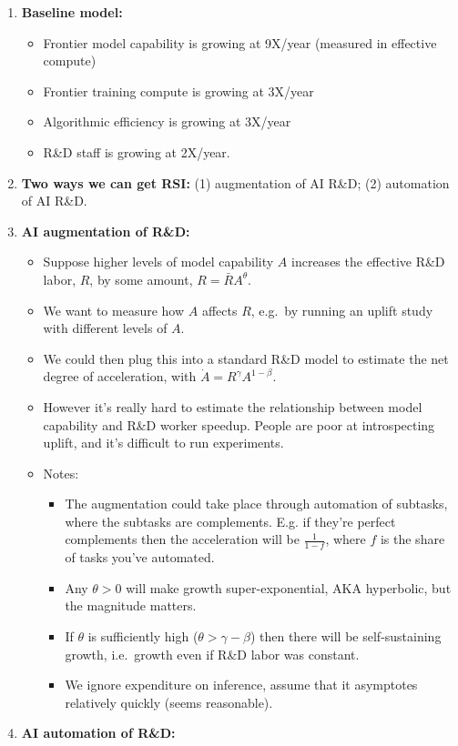 \documentclass[
  11pt,
  letterpaper,
  DIV=11,
  numbers=noendperiod]{scrartcl}
\providecommand{\tightlist}{%
  \setlength{\itemsep}{0pt}\setlength{\parskip}{0pt}}
\begin{document}
\begin{enumerate}
\def\labelenumi{\arabic{enumi}.}
\item
  \textbf{Baseline model:}

  \begin{itemize}
  \tightlist
  \item
    Frontier model capability is growing at 9X/year (measured in
    effective compute)
  \item
    Frontier training compute is growing at 3X/year
  \item
    Algorithmic efficiency is growing at 3X/year
  \item
    R\&D staff is growing at 2X/year.
  \end{itemize}
\item
  \textbf{Two ways we can get RSI:} (1) augmentation of AI R\&D; (2)
  automation of AI R\&D.
\item
  \textbf{AI augmentation of R\&D:}

  \begin{itemize}
  \tightlist
  \item
    Suppose higher levels of model capability \(A\) increases the
    effective R\&D labor, \(R\), by some amount, \(R=\bar{R}A^\theta\).
  \item
    We want to measure how \(A\) affects \(R\), e.g.~by running an
    uplift study with different levels of \(A\).
  \item
    We could then plug this into a standard R\&D model to estimate the
    net degree of acceleration, with \(\dot{A}=R^\gamma A^{1-\beta}\).
  \item
    However it's really hard to estimate the relationship between model
    capability and R\&D worker speedup. People are poor at introspecting
    uplift, and it's difficult to run experiments.
  \item
    Notes:

    \begin{itemize}
    \tightlist
    \item
      The augmentation could take place through automation of subtasks,
      where the subtasks are complements. E.g. if they're perfect
      complements then the acceleration will be \(\frac{1}{1-f}\), where
      \(f\) is the share of tasks you've automated.
    \item
      Any \(\theta>0\) will make growth super-exponential, AKA
      hyperbolic, but the magnitude matters.
    \item
      If \(\theta\) is sufficiently high (\(\theta>\gamma-\beta\)) then
      there will be self-sustaining growth, i.e.~growth even if R\&D
      labor was constant.
    \item
      We ignore expenditure on inference, assume that it asymptotes
      relatively quickly (seems reasonable).
    \end{itemize}
  \end{itemize}
\item
  \textbf{AI automation of R\&D:}


\end{enumerate}
\end{document}
